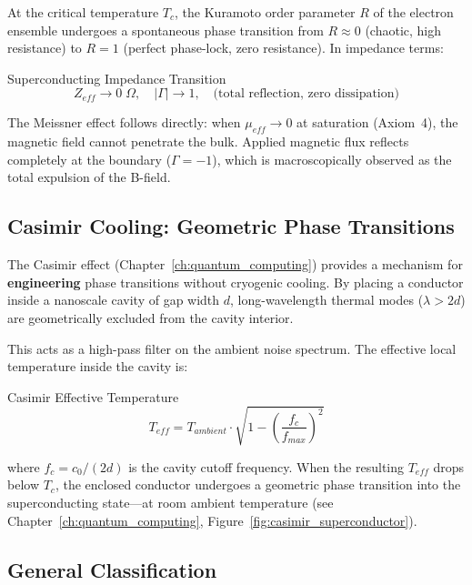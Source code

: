 At the critical temperature $T_c$, the Kuramoto order parameter $R$ of the electron ensemble undergoes a spontaneous phase transition from $R \approx 0$ (chaotic, high resistance) to $R = 1$ (perfect phase-lock, zero resistance). In impedance terms:
\begin{resultbox}{Superconducting Impedance Transition}
\begin{equation}
    Z_{eff} \to 0 \;\Omega, \quad |\Gamma| \to 1, \quad \text{(total reflection, zero dissipation)}
    \label{eq:superconducting_impedance}
\end{equation}
\end{resultbox}

The Meissner effect follows directly: when $\mu_{eff} \to 0$ at saturation (Axiom~4), the magnetic field cannot penetrate the bulk. Applied magnetic flux reflects completely at the boundary ($\Gamma = -1$), which is macroscopically observed as the total expulsion of the B-field.

\subsection{Casimir Cooling: Geometric Phase Transitions}

The Casimir effect (Chapter~\ref{ch:quantum_computing}) provides a mechanism for \textbf{engineering} phase transitions without cryogenic cooling. By placing a conductor inside a nanoscale cavity of gap width $d$, long-wavelength thermal modes ($\lambda > 2d$) are geometrically excluded from the cavity interior.

This acts as a high-pass filter on the ambient noise spectrum. The effective local temperature inside the cavity is:
\begin{resultbox}{Casimir Effective Temperature}
\begin{equation}
    T_{eff} = T_{ambient} \cdot \sqrt{1 - \left(\frac{f_c}{f_{max}}\right)^2}
    \label{eq:casimir_temperature}
\end{equation}
\end{resultbox}
where $f_c = c_0 / (2d)$ is the cavity cutoff frequency. When the resulting $T_{eff}$ drops below $T_c$, the enclosed conductor undergoes a geometric phase transition into the superconducting state---at room ambient temperature (see Chapter~\ref{ch:quantum_computing}, Figure~\ref{fig:casimir_superconductor}).

\subsection{General Classification}

